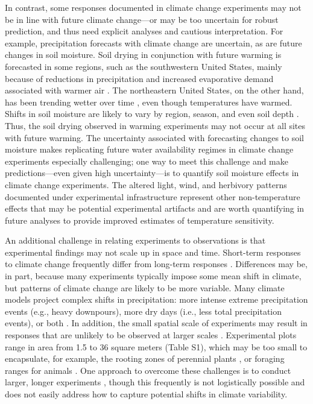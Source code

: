 \documentclass{article}
\begin{document}
\par In contrast, some responses documented in climate change experiments may not be in line with future climate change---or may be too uncertain for robust prediction, and thus need explicit analyses and cautious interpretation.
For example, precipitation forecasts with climate change are uncertain, as are future changes in soil moisture. Soil drying in conjunction with future warming is forecasted in some regions, such as the southwestern United States, mainly because of reductions in precipitation and increased evaporative demand associated with warmer air \citep{dai2013,seager2013}. The northeastern United States, on the other hand, has been trending wetter over time \citep{shuman2017}, even though temperatures have warmed.  Shifts in soil moisture are likely to vary by region, season, and even soil depth \citep{seager2014,berg2017}. Thus, the soil drying observed in warming experiments may not occur at all sites with future warming. The uncertainty associated with forecasting changes to soil moisture makes replicating future water availability regimes in climate change experiments especially challenging; one way to meet this challenge and make predictions---even given high uncertainty---is to quantify soil moisture effects in climate change experiments. The altered light, wind, and herbivory patterns documented under experimental infrastructure \citep{kennedy1995,moise2010,wolkovich2012,hoeppner2012, clark2014b} represent other non-temperature effects that may be potential experimental artifacts and are worth quantifying in future analyses to provide improved estimates of temperature sensitivity.
\par An additional challenge in relating experiments to observations is that experimental findings may not scale up in space and time. Short-term responses to climate change frequently differ from long-term responses \citep{woodward1992,elmendorf2012, andresen2016, reich2018}. Differences may be, in part, because many experiments typically impose some mean shift in climate, but patterns of climate change are likely to be more variable. Many climate models project complex shifts in precipitation: more intense extreme precipitation events (e.g., heavy downpours), more dry days (i.e., less total precipitation events), or both \citep{polade2014}. In addition, the small spatial scale of experiments may result in responses that are unlikely to be observed at larger scales \citep{woodward1992,menke2014}. Experimental plots range in area from 1.5 to 36 square meters (Table S1), which may be too small to encapsulate, for example, the rooting zones of perennial plants \citep{canadell1996}, or foraging ranges for animals \citep{menke2014}. One approach to overcome these challenges is to conduct larger, longer experiments \citep{woodward1992}, though this frequently is not logistically possible and does not easily address how to capture potential shifts in climate variability. 
\end{document}
